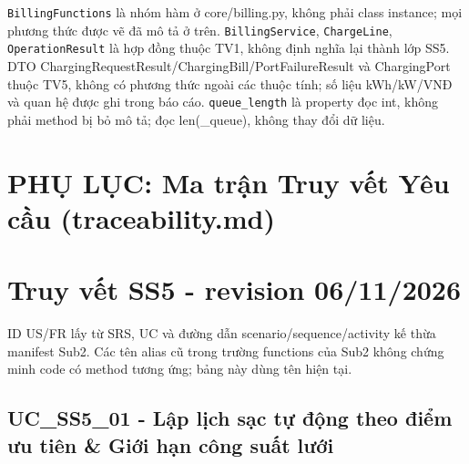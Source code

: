\documentclass[11pt,a4paper]{article}
\begin{document}
\texttt{BillingFunctions} là nhóm hàm ở core/billing.py, không phải
class instance; mọi phương thức được vẽ đã mô tả ở trên.
\texttt{BillingService}, \texttt{ChargeLine}, \texttt{OperationResult}
là hợp đồng thuộc TV1, không định nghĩa lại thành lớp SS5. DTO
ChargingRequestResult/ChargingBill/PortFailureResult và ChargingPort
thuộc TV5, không có phương thức ngoài các thuộc tính; số liệu kWh/kW/VNĐ
và quan hệ được ghi trong báo cáo. \texttt{queue\_length} là property
đọc int, không phải method bị bỏ mô tả; đọc len(\_queue), không thay đổi
dữ liệu.

\newpage
\section*{PHỤ LỤC: Ma trận Truy vết Yêu cầu (traceability.md)}
\hypertarget{truy-vux1ebft-ss5---revision-06112026}{%
\section{Truy vết SS5 - revision
06/11/2026}\label{truy-vux1ebft-ss5---revision-06112026}}

ID US/FR lấy từ SRS, UC và đường dẫn scenario/sequence/activity kế thừa
manifest Sub2. Các tên alias cũ trong trường functions của Sub2 không
chứng minh code có method tương ứng; bảng này dùng tên hiện tại.

\hypertarget{uc_ss5_01---lux1eadp-lux1ecbch-sux1ea1c-tux1ef1-ux111ux1ed9ng-theo-ux111iux1ec3m-ux1b0u-tiuxean-giux1edbi-hux1ea1n-cuxf4ng-suux1ea5t-lux1b0ux1edbi}{%
\subsection{UC\_SS5\_01 - Lập lịch sạc tự động theo điểm ưu tiên \& Giới
hạn công suất
lưới}\label{uc_ss5_01---lux1eadp-lux1ecbch-sux1ea1c-tux1ef1-ux111ux1ed9ng-theo-ux111iux1ec3m-ux1b0u-tiuxean-giux1edbi-hux1ea1n-cuxf4ng-suux1ea5t-lux1b0ux1edbi}}
\end{document}
